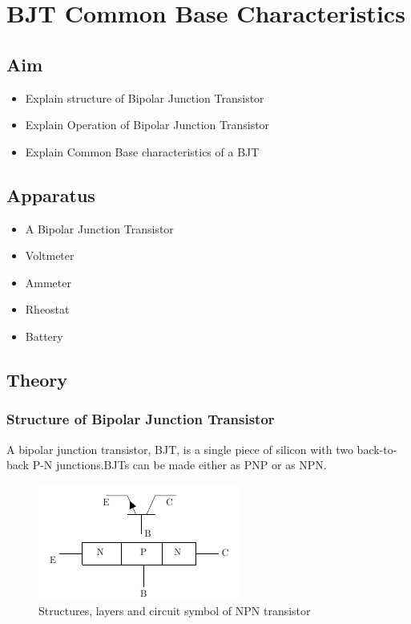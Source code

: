 \chapter{BJT Common Base Characteristics}
	\section{Aim}
		\begin{itemize}
			\tightlist
			\item Explain structure of Bipolar Junction Transistor
			\item Explain Operation of Bipolar Junction Transistor
			\item Explain Common Base characteristics of a BJT
		\end{itemize}
	
	\section{Apparatus}
		\begin{itemize}
			\tightlist
			\item A Bipolar Junction Transistor
			\item Voltmeter
			\item Ammeter
			\item Rheostat
			\item Battery
		\end{itemize}
	
	\section{Theory}
		\subsection{Structure of Bipolar Junction Transistor}
			A bipolar junction transistor, BJT, is a single piece of silicon with two back-to-back P-N junctions.BJTs can be made either as PNP or as NPN.
			\begin{figure}[h]
				\centering
				\includegraphics[width=0.5\linewidth]{img/exp10/1}
				\caption{Structures, layers and circuit symbol of NPN transistor}
				\label{fig:bjt2_npn}
			\end{figure}
		
